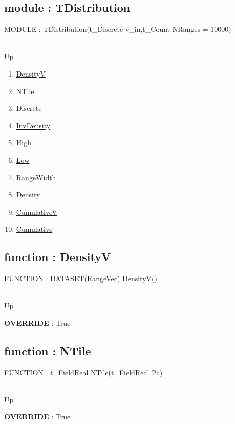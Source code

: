 \subsection*{module : TDistribution}
\hypertarget{ecldoc:linearregression.ols.tdistribution}{MODULE : TDistribution(t\_Discrete v\_in,t\_Count NRanges = 10000)} \\
\hyperlink{ecldoc:linearregression.ols}{Up} \\
\par
\begin{enumerate}
\item \hyperlink{ecldoc:linearregression.ols.distributionbase.densityv}{DensityV}
\item \hyperlink{ecldoc:linearregression.ols.distributionbase.ntile}{NTile}
\item \hyperlink{ecldoc:linearregression.ols.distributionbase.discrete}{Discrete}
\item \hyperlink{ecldoc:linearregression.ols.tdistribution.invdensity}{InvDensity}
\item \hyperlink{ecldoc:linearregression.ols.tdistribution.high}{High}
\item \hyperlink{ecldoc:linearregression.ols.tdistribution.low}{Low}
\item \hyperlink{ecldoc:linearregression.ols.tdistribution.rangewidth}{RangeWidth}
\item \hyperlink{ecldoc:linearregression.ols.tdistribution.density}{Density}
\item \hyperlink{ecldoc:linearregression.ols.tdistribution.cumulativev}{CumulativeV}
\item \hyperlink{ecldoc:linearregression.ols.tdistribution.cumulative}{Cumulative}
\end{enumerate}
\subsection*{function : DensityV}
\hypertarget{ecldoc:linearregression.ols.distributionbase.densityv}{FUNCTION : DATASET(RangeVec) DensityV()} \\
\hyperlink{ecldoc:linearregression.ols.tdistribution}{Up} \\
\par
\textbf{OVERRIDE} : True \\
\subsection*{function : NTile}
\hypertarget{ecldoc:linearregression.ols.distributionbase.ntile}{FUNCTION : t\_FieldReal NTile(t\_FieldReal Pc)} \\
\hyperlink{ecldoc:linearregression.ols.tdistribution}{Up} \\
\par
\textbf{OVERRIDE} : True \\
